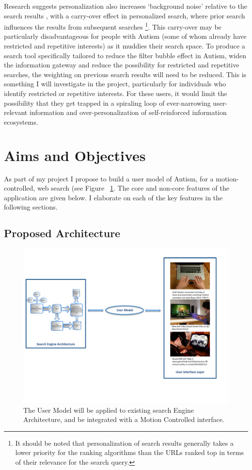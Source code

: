\documentclass[a4paper, 10pt]{article}
\begin{document}
Research suggests personalization also increases ‘background noise’ relative to the search results \cite{briggs}, with a carry-over effect in personalized search, where prior search influences the results from subsequent searches \footnote{It should be noted that personalization of search results generally takes a lower priority for the ranking algorithms than the URLs ranked top in terms of their relevance for the search query.}. This carry-over may be particularly disadvantageous for people with Autism (some of whom already have restricted and repetitive interests) as it muddies their search space. To produce a search tool specifically tailored to reduce the filter bubble effect in Autism, widen the information gateway and reduce the possibility for restricted and repetitive searches, the weighting on previous search results will need to be reduced. This is something I will investigate in the project, particularly for individuals who identify restricted or repetitive interests. For these users, it would limit the possibility that they get trapped in a spiraling loop of ever-narrowing user-relevant information and over-personalization of self-reinforced information ecosystems.

\section{Aims and Objectives} 
As part of my project I propose to build a user model of Autism, for a motion-controlled, web search (see Figure ~\ref{architec}. The core and non-core features of the application are given below. I elaborate on each of the key features in the following sections. 

\subsection{Proposed Architecture}\label{proposed}
\begin{center}
\begin{figure}[H]
    \includegraphics[scale=0.6]{searchEngArchi}
    \caption{The User Model will be applied to existing search Engine Architecture\cite{seimage}, and be integrated with a Motion Controlled interface.}
    \label{architec}
\end{figure}
\end{center}
\end{document}
